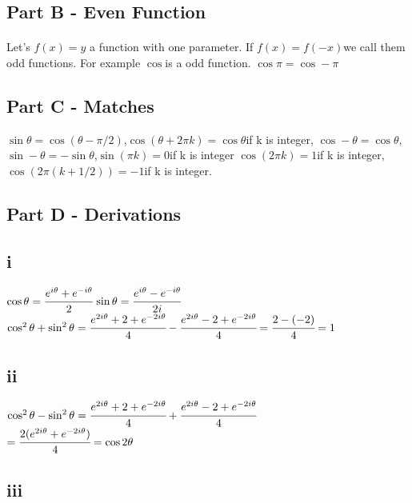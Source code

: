 \documentclass[a4paper, 12pt, titlepage]{article}
\begin{document}
\subsection{Part B - Even Function}
\paragraph{}Let's $ f(x) = y $ \space a function with one parameter. If $ f(x) = f(-x) $\space we call them odd functions. For example $ \cos$\space is a odd function. $ \cos \pi = \cos -\pi $
\subsection{Part C - Matches}
$\sin \theta = \cos(\theta - \pi/2)$,\space $\cos(\theta + 2\pi k) = \cos \theta$\space if k is integer, $ \cos -\theta = \cos \theta$,
\space $ \sin -\theta  = - \sin \theta $,\space $ \sin(\pi k) = 0$\space if k is integer $ \cos(2\pi k) = 1$\space if k is integer, $ \cos(2\pi(k+1/2)) = -1$\space if k is integer.
\subsection{Part D - Derivations}
\subsection{i}
\begin{center}

$ \cos \theta =\cfrac{e^{i\theta}+e^{-i\theta}}{2}\, \sin \theta =\cfrac{e^{i\theta} - e^{-i\theta}}{2i}$ \\
$\cos ^{2} \theta + \sin ^2 \theta = \cfrac{e^{2i\theta }+ 2 + e^{-2i\theta}}{4} - \cfrac{e^{2i\theta } - 2 + e^{-2i\theta}}{4} = \cfrac{2-(-2)}{4} = 1$
\end{center}
\subsection{ii}

\begin{center}
    $\cos ^{2} \theta - \sin ^2 \theta = \cfrac{e^{2i\theta }+ 2 + e^{-2i\theta}}{4} + \cfrac{e^{2i\theta } - 2 + e^{-2i\theta}}{4}$ \\
$ = \cfrac{2(e^{2i\theta} + e^{-2i\theta})}{4} =  \cos 2 \theta $
\end{center}
\subsection{iii}
\end{document}
